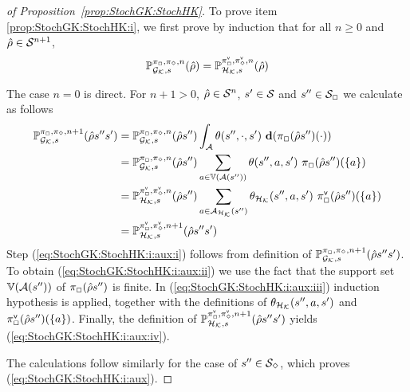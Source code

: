 \begin{proof}[of Proposition~\ref{prop:StochGK:StochHK}]
  To prove item \ref{prop:StochGK:StochHK:i}, we first prove by
  induction that for all $n\geq0$ and $\hat{\rho}\in\mathcal{S}^{n+1}$,
  \begin{equation}\label{eq:StochGK:StochHK:i:aux}
    \mathbb{P}^{\pi_{{\Box}},\pi_{{\Diamond}},n}_{{\mathcal{G}_{\mathcal{K}}},s}(\hat{\rho}) =
    \mathbb{P}^{{\pi}^{\mathsf{v}}_{{\Box}},{\pi}^{\mathsf{v}}_{{\Diamond}},n}_{{\mathcal{H}_{\mathcal{K}}},s}(\hat{\rho})
  \end{equation}

  The case $n=0$ is direct. For $n+1>0$, $\hat{\rho}\in\mathcal{S}^n$,
  $s'\in\mathcal{S}$ and $s''\in\mathcal{S}_{\Box}$ we calculate as follows
  \begin{align}
    \Prob^{\strat_{\maxplay},\strat_{\minplay},n+1}_{\StochGK,s}(\hat{\rho}s''s')
    & =
    \Prob^{\strat_{\maxplay},\strat_{\minplay},n}_{\StochGK,s}(\hat{\rho}s'')\int_{\sgactions}\sgtrans(s'',\cdot,s')\ \diff(\strat_{\maxplay}(\hat{\rho}s'')(\cdot))
    \label{eq:StochGK:StochHK:i:aux:i}\\
    & =
    \Prob^{\strat_{\maxplay},\strat_{\minplay},n}_{\StochGK,s}(\hat{\rho}s'')\sum_{a\in\vertices(\enabled(s''))}\sgtrans(s'',a,s')\mult\strat_{\maxplay}(\hat{\rho}s'')(\{a\})
    \label{eq:StochGK:StochHK:i:aux:ii}\\
    & =
    \Prob^{\stratv_{\maxplay},\stratv_{\minplay},n}_{\StochHK,s}(\hat{\rho}s'')\sum_{a\in\enabled_\StochHK(s'')}\sgtrans_\StochHK(s'',a,s')\mult\stratv_{\maxplay}(\hat{\rho}s'')(\{a\})
    \label{eq:StochGK:StochHK:i:aux:iii}\\
    & =
    \Prob^{\stratv_{\maxplay},\stratv_{\minplay},n+1}_{\StochHK,s}(\hat{\rho}s''s')
    \label{eq:StochGK:StochHK:i:aux:iv}
  \end{align}
  Step (\ref{eq:StochGK:StochHK:i:aux:i}) follows from definition of
  $\mathbb{P}^{\pi_{{\Box}},\pi_{{\Diamond}},n+1}_{{\mathcal{G}_{\mathcal{K}}},s}(\hat{\rho}s''s')$.
  To obtain (\ref{eq:StochGK:StochHK:i:aux:ii}) we use the fact that
  the support set $\mathbb{V}(\mathcal{A}(s''))$ of
  $\pi_{\Box}(\hat{\rho}s'')$ is finite.
  In (\ref{eq:StochGK:StochHK:i:aux:iii}) induction hypothesis is
  applied, together with the definitions of
  $\theta_{\mathcal{H}_{\mathcal{K}}}(s'',a,s')$ and
  ${\pi}^{\mathsf{v}}_{{\Box}}(\hat{\rho}s'')(\{a\})$.
  Finally, the definition of
  $\mathbb{P}^{{\pi}^{\mathsf{v}}_{{\Box}},{\pi}^{\mathsf{v}}_{{\Diamond}},n+1}_{{\mathcal{H}_{\mathcal{K}}},s}(\hat{\rho}s''s')$
  yields (\ref{eq:StochGK:StochHK:i:aux:iv}).
  
  The calculations follow similarly for the case of $s''\in\mathcal{S}_{\Diamond}$,
  which proves (\ref{eq:StochGK:StochHK:i:aux}).


\end{proof}
